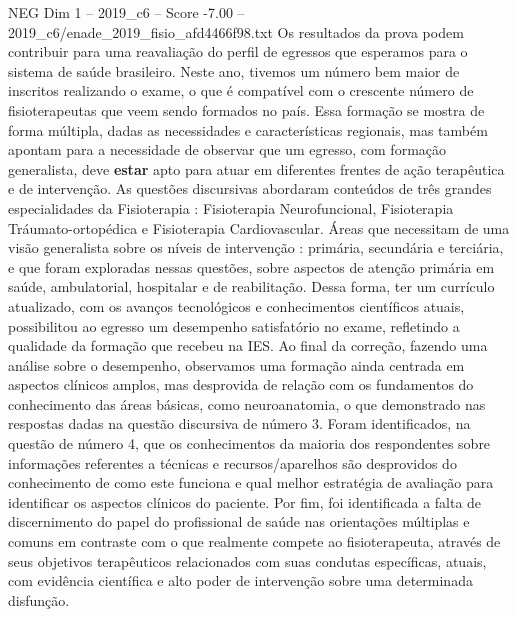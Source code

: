 \begin{textsample}{NEG Dim 1 – 2019\_c6 – Score -7.00 – 2019\_c6/enade\_2019\_fisio\_afd4466f98.txt}
Os resultados da prova podem contribuir para uma reavaliação do perfil de egressos que esperamos para o sistema de saúde brasileiro.
Neste ano, tivemos um número bem maior de inscritos realizando o exame, o que é compatível com o crescente número de fisioterapeutas que veem sendo formados no país.
Essa formação se mostra de forma múltipla, dadas as necessidades e características regionais, mas também apontam para a necessidade de observar que um egresso, com formação generalista, deve \textbf{estar} apto para atuar em diferentes frentes de ação terapêutica e de intervenção.
As questões discursivas abordaram conteúdos de três grandes especialidades da Fisioterapia : Fisioterapia Neurofuncional, Fisioterapia Tráumato-ortopédica e Fisioterapia Cardiovascular.
Áreas que necessitam de uma visão generalista sobre os níveis de intervenção : primária, secundária e terciária, e que foram exploradas nessas questões, sobre aspectos de atenção primária em saúde, ambulatorial, hospitalar e de reabilitação.
Dessa forma, ter um currículo atualizado, com os avanços tecnológicos e conhecimentos científicos atuais, possibilitou ao egresso um desempenho satisfatório no exame, refletindo a qualidade da formação que recebeu na IES.
Ao final da correção, fazendo uma análise sobre o desempenho, observamos uma formação ainda centrada em aspectos clínicos amplos, mas desprovida de relação com os fundamentos do conhecimento das áreas básicas, como neuroanatomia, o que demonstrado nas respostas dadas na questão discursiva de número 3.
Foram identificados, na questão de número 4, que os conhecimentos da maioria dos respondentes sobre informações referentes a técnicas e recursos/aparelhos são desprovidos do conhecimento de como este funciona e qual melhor estratégia de avaliação para identificar os aspectos clínicos do paciente.
Por fim, foi identificada a falta de discernimento do papel do profissional de saúde nas orientações múltiplas e comuns em contraste com o que realmente compete ao fisioterapeuta, através de seus objetivos terapêuticos relacionados com suas condutas específicas, atuais, com evidência científica e alto poder de intervenção sobre uma determinada disfunção.

\end{textsample}
